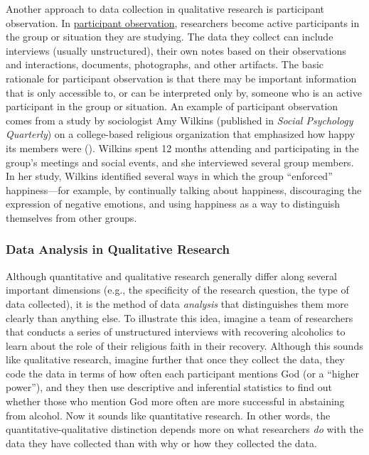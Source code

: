 \documentclass[
]{krantz}
\begin{document}
Another approach to data collection in qualitative research is participant observation. In \hyperref[participant-observation]{participant observation}, researchers become active participants in the group or situation they are studying. The data they collect can include interviews (usually unstructured), their own notes based on their observations and interactions, documents, photographs, and other artifacts. The basic rationale for participant observation is that there may be important information that is only accessible to, or can be interpreted only by, someone who is an active participant in the group or situation. An example of participant observation comes from a study by sociologist Amy Wilkins (published in \emph{Social Psychology Quarterly}) on a college-based religious organization that emphasized how happy its members were (). Wilkins spent 12 months attending and participating in the group's meetings and social events, and she interviewed several group members. In her study, Wilkins identified several ways in which the group ``enforced'' happiness---for example, by continually talking about happiness, discouraging the expression of negative emotions, and using happiness as a way to distinguish themselves from other groups.

\subsubsection*{Data Analysis in Qualitative Research}\label{data-analysis-in-qualitative-research}


Although quantitative and qualitative research generally differ along several important dimensions (e.g., the specificity of the research question, the type of data collected), it is the method of data \emph{analysis} that distinguishes them more clearly than anything else. To illustrate this idea, imagine a team of researchers that conducts a series of unstructured interviews with recovering alcoholics to learn about the role of their religious faith in their recovery. Although this sounds like qualitative research, imagine further that once they collect the data, they code the data in terms of how often each participant mentions God (or a ``higher power''), and they then use descriptive and inferential statistics to find out whether those who mention God more often are more successful in abstaining from alcohol. Now it sounds like quantitative research. In other words, the quantitative-qualitative distinction depends more on what researchers \emph{do} with the data they have collected than with why or how they collected the data.
\end{document}
